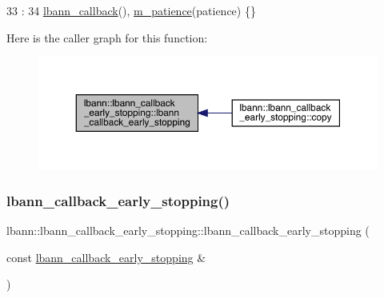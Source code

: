 \begin{DoxyCode}
33                                                                              :
34   \hyperlink{classlbann_1_1lbann__callback_a679057298a41ddd47f08c157f756c584}{lbann\_callback}(), \hyperlink{classlbann_1_1lbann__callback__early__stopping_ada95898e18dbed5adf1848919affd6ee}{m\_patience}(patience) \{\}
\end{DoxyCode}
Here is the caller graph for this function\+:\nopagebreak
\begin{figure}[H]
\begin{center}
\leavevmode
\includegraphics[width=350pt]{classlbann_1_1lbann__callback__early__stopping_ac0140e05eccd5280d53a8e8d480c0ce3_icgraph}
\end{center}
\end{figure}
\mbox{\label{classlbann_1_1lbann__callback__early__stopping_a7ff0175e34065c24d2c4090ff90ef614}} 
\subsubsection{\texorpdfstring{lbann\+\_\+callback\+\_\+early\+\_\+stopping()}{lbann\_callback\_early\_stopping()}\hspace{0.1cm}{\footnotesize\ttfamily [2/2]}}
{\footnotesize\ttfamily lbann\+::lbann\+\_\+callback\+\_\+early\+\_\+stopping\+::lbann\+\_\+callback\+\_\+early\+\_\+stopping (\begin{DoxyParamCaption}\item[{const \hyperlink{classlbann_1_1lbann__callback__early__stopping}{lbann\+\_\+callback\+\_\+early\+\_\+stopping} \&}]{ }\end{DoxyParamCaption})\hspace{0.3cm}{\ttfamily [default]}}



